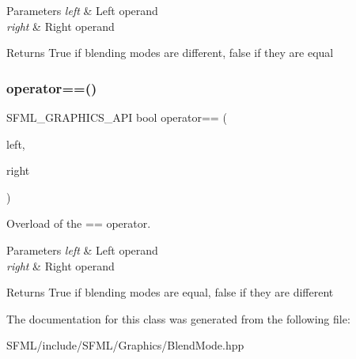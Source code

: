 \begin{DoxyParams}{Parameters}
{\em left} & Left operand \\
\hline
{\em right} & Right operand\\
\hline
\end{DoxyParams}
\begin{DoxyReturn}{Returns}
True if blending modes are different, false if they are equal \begin{DoxyVerb}\end{DoxyVerb}
 
\end{DoxyReturn}
\mbox{\label{structsf_1_1_blend_mode_ae13d2e80e55c5263eb9413fde7f74443}} 
\subsubsection{\texorpdfstring{operator==()}{operator==()}}
{\footnotesize\ttfamily S\+F\+M\+L\+\_\+\+G\+R\+A\+P\+H\+I\+C\+S\+\_\+\+A\+PI bool operator== (\begin{DoxyParamCaption}\item[{const \mbox{\hyperlink{structsf_1_1_blend_mode}{Blend\+Mode}} \&}]{left,  }\item[{const \mbox{\hyperlink{structsf_1_1_blend_mode}{Blend\+Mode}} \&}]{right }\end{DoxyParamCaption})\hspace{0.3cm}{\ttfamily [related]}}



Overload of the == operator. 


\begin{DoxyParams}{Parameters}
{\em left} & Left operand \\
\hline
{\em right} & Right operand\\
\hline
\end{DoxyParams}
\begin{DoxyReturn}{Returns}
True if blending modes are equal, false if they are different \begin{DoxyVerb}\end{DoxyVerb}
 
\end{DoxyReturn}


The documentation for this class was generated from the following file\+:\begin{DoxyCompactItemize}
\item 
S\+F\+M\+L/include/\+S\+F\+M\+L/\+Graphics/Blend\+Mode.\+hpp\end{DoxyCompactItemize}
